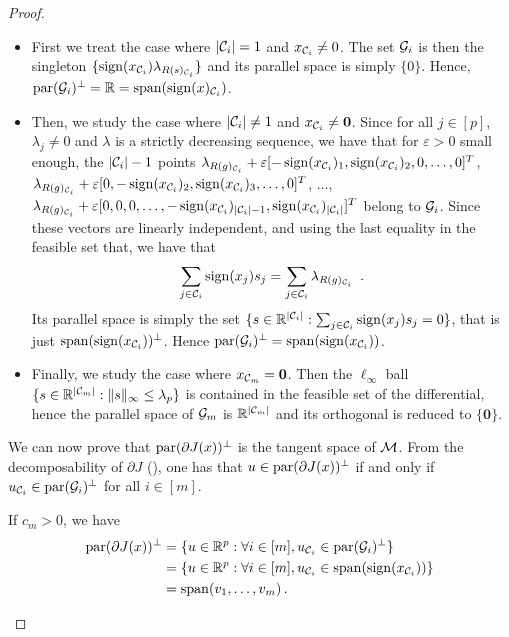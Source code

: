 \begin{proof}
\begin{enumerate}
\begin{itemize}
			      \item First we treat the case where $|\mathcal{C}_i|=1$  and $x_{\mathcal{C}_i}\neq 0$.
			            The set $\mathcal{G}_i$ is then the singleton $\{\operatorname{sign}(x_{\mathcal{C}_i})\lambda_{R(s)_{\mathcal{C}_i}}\}$ and its parallel space is simply $\{0\}$.
			            Hence, $\operatorname{par}(\mathcal{G}_i)^\perp = \mathbb{R} = \operatorname{span} (\operatorname{sign}(x)_{\mathcal{C}_i})$.
			      \item Then, we study the case where $|\mathcal{C}_i|\neq 1$  and $x_{\mathcal{C}_i}\neq \textbf{0}$.
			            Since for all $j \in [p]$, $\lambda_j\neq 0$ and $\lambda$ is a strictly decreasing sequence, we have that for $\varepsilon > 0$ small enough, the $|\mathcal{C}_i| -1$ points $\lambda_{R(g)_{\mathcal{C}_i}} + \varepsilon [-\operatorname{sign}(x_{\mathcal{C}_i})_1, \operatorname{sign}(x_{\mathcal{C}_i})_2, 0, \hdots, 0]^T$, $\lambda_{R(g)_{\mathcal{C}_i}} + \varepsilon [0, -\operatorname{sign}(x_{\mathcal{C}_i})_2, \operatorname{sign}(x_{\mathcal{C}_i})_3, \hdots, 0]^T$, $\hdots$, $\lambda_{R(g)_{\mathcal{C}_i}} + \varepsilon [0, 0, 0, \hdots,-\operatorname{sign}(x_{\mathcal{C}_i})_{|\mathcal{C}_{i}|-1}, \operatorname{sign}(x_{\mathcal{C}_i})_{|\mathcal{C}_{i}|}]^T$ belong to $\mathcal{G}_i$.
			            Since these vectors are linearly independent, and using the last equality in the feasible set that, we have that
			            \begin{align}
				            \sum_{j\in \mathcal{C}_i} \operatorname{sign}(x_j)s_j = \sum_{j \in \mathcal{C}_i}  \lambda_{R(g)_{\mathcal{C}_i}} \nonumber \enspace .
			            \end{align}
			            Its parallel space is simply the set $\{s\in\mathbb{R}^{|\mathcal{C}_i|} : \sum_{j\in \mathcal{C}_i} \operatorname{sign}(x_j)s_j = 0\}$, that is just $\operatorname{span}(\operatorname{sign}(x_{\mathcal{C}_i}))^\perp$.
			            Hence $\operatorname{par}(\mathcal{G}_i)^\perp = \operatorname{span}(\operatorname{sign}(x_{\mathcal{C}_i}))$.

			      \item  Finally, we study the case where $x_{\mathcal{C}_m} = \textbf{0}$.
			            Then the $\ell_\infty$ ball $\{s \in \mathbb{R}^{|\mathcal{C}_m|}: \Vert s \Vert_\infty \leq \lambda_p\}$ is contained in the feasible set of the differential, hence the parallel space of $\mathcal{G}_m$ is $\mathbb{R}^{|\mathcal{C}_m|}$ and its orthogonal is reduced to $\{ \mathbf{0} \}$.
		      \end{itemize}

		      We can now prove that $\operatorname{par}(\partial J(x))^\perp$ is the tangent space of $\mathcal{M}$.
		      From the decomposability of $\partial J$ (), one has that $u \in \operatorname{par}(\partial J(x)) ^\perp$ if and only if $u_{\mathcal{C}_i} \in \operatorname{par} (\mathcal{G}_i)^\perp$ for all $i \in [m]$.

		      If $c_m > 0$, we have
		      \begin{equation}
			      \begin{aligned}
				      \operatorname{par}(\partial J(x))^\perp & = \{ u \in \mathbb{R}^p : \forall i \in [m], u_{\mathcal{C}_i} \in \operatorname{par} (\mathcal{G}_i)^\perp \}   \\
				                                   & = \{ u \in \mathbb{R}^p : \forall i \in [m], u_{\mathcal{C}_i} \in \operatorname{span}(\operatorname{sign}(x_{\mathcal{C}_i})) \} \\
				                                   & = \operatorname{span}(v_1, \ldots, v_m) \, .
			      \end{aligned}
		      \end{equation}


\end{enumerate}
\end{proof}
